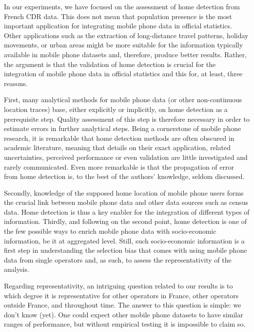 \documentclass[a4paper]{article}
\begin{document}
In our experiments, we have focused on the assessment of home detection from French CDR data. This does not mean that population presence is the most important application for integrating mobile phone data in official statistics. Other applications such as the extraction of long-distance travel patterns, holiday movements, or urban areas might be more suitable for the information typically available in mobile phone datasets and, therefore, produce better results. Rather, the argument is that the validation of home detection is crucial for the integration of mobile phone data in official statistics and this for, at least, three reasons. 

First, many analytical methods for mobile phone data (or other non-continuous location traces) base, either explicitly or implicitly, on home detection as a prerequisite step. Quality assessment of this step is therefore necessary in order to estimate errors in further analytical steps. Being a cornerstone of mobile phone research, it is remarkable that home detection methods are often obscured in academic literature, meaning that details on their exact application, related uncertainties, perceived performance or even validation are little investigated and rarely communicated. Even more remarkable is that the propagation of error from home detection is, to the best of the authors' knowledge, seldom discussed. 

Secondly, knowledge of the supposed home location of mobile phone users forms the crucial link between mobile phone data and other data sources such as census data. Home detection is thus a key enabler for the integration of different types of information. Thirdly, and following on the second point, home detection is one of the few possible ways to enrich mobile phone data with socio-economic information, be it at aggregated level. Still, such socio-economic information is a first step in understanding the selection bias that comes with using mobile phone data from single operators and, as such, to assess the representativity of the analysis.   

Regarding representativity, an intriguing question related to our results is to which degree it is representative for other operators in France, other operators outside France, and throughout time. The answer to this question is simple: we don't know (yet). One could expect other mobile phone datasets to have similar ranges of performance, but without empirical testing it is impossible to claim so.   
\end{document}
